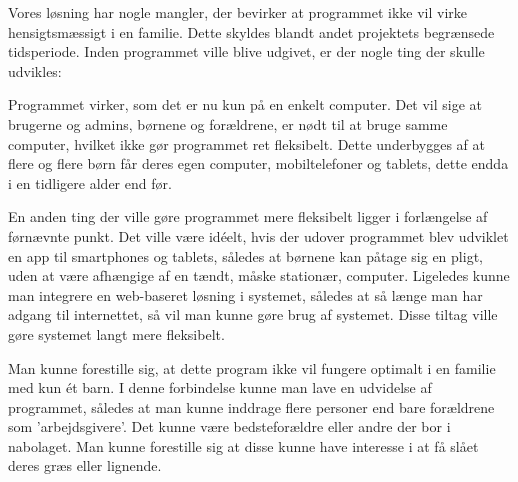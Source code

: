 Vores løsning har nogle mangler, der bevirker at programmet ikke vil virke hensigtsmæssigt i en familie. Dette skyldes blandt andet projektets begrænsede tidsperiode. Inden programmet ville blive udgivet, er der nogle ting der skulle udvikles:

Programmet virker, som det er nu kun på en enkelt computer. Det vil sige at brugerne og admins, børnene og forældrene, er nødt til at bruge samme computer, hvilket ikke gør programmet ret fleksibelt. Dette underbygges af at flere og flere børn får deres egen computer, mobiltelefoner og tablets, dette endda i en tidligere alder end før.\cite{MobilAlder}

En anden ting der ville gøre programmet mere fleksibelt ligger i forlængelse af førnævnte punkt. Det ville være idéelt, hvis der udover programmet blev udviklet en app til smartphones og tablets, således at børnene kan påtage sig en pligt, uden at være afhængige af en tændt, måske stationær, computer. Ligeledes kunne man integrere en web-baseret løsning i systemet, således at så længe man har adgang til internettet, så vil man kunne gøre brug af systemet. Disse tiltag ville gøre systemet langt mere fleksibelt.

Man kunne forestille sig, at dette program ikke vil fungere optimalt i en familie med kun ét barn. I denne forbindelse kunne man lave en udvidelse af programmet, således at man kunne inddrage flere personer end bare forældrene som 'arbejdsgivere'. Det kunne være bedsteforældre eller andre der bor i nabolaget. Man kunne forestille sig at disse kunne have interesse i at få slået deres græs eller lignende.

